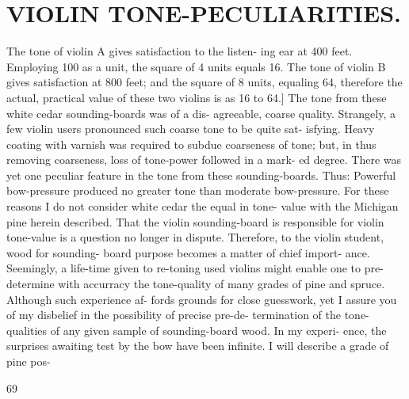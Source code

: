 \documentclass{article}
\begin{document}
\section*{VIOLIN TONE-PECULIARITIES.}
The tone of violin A gives satisfaction to the listen- ing ear at 400 feet. Employing 100 as a unit, the square of 4 units equals 16. The tone of violin B gives satisfaction at 800 feet; and the square of 8 units, equaling 64, therefore the actual, practical value of these two violins is as 16 to 64.] The tone from these white cedar sounding-boards was of a dis- agreeable, coarse quality. Strangely, a few violin users pronounced such coarse tone to be quite sat- isfying. Heavy coating with varnish was required to subdue coarseness of tone; but, in thus removing coarseness, loss of tone-power followed in a mark- ed degree. There was yet one peculiar feature in the tone from these sounding-boards. Thus: Powerful bow-pressure produced no greater tone than moderate bow-pressure. For these reasons I do not consider white cedar the equal in tone- value with the Michigan pine herein described. That the violin sounding-board is responsible for violin tone-value is a question no longer in dispute. Therefore, to the violin student, wood for sounding- board purpose becomes a matter of chief import- ance. Seemingly, a life-time given to re-toning used violins might enable one to pre-determine with accurracy the tone-quality of many grades of pine and spruce. Although such experience af- fords grounds for close guesswork, yet I assure you of my disbelief in the possibility of precise pre-de- termination of the tone-qualities of any given sample of sounding-board wood. In my experi- ence, the surprises awaiting test by the bow have been infinite. I will describe a grade of pine pos-

69
\end{document}
